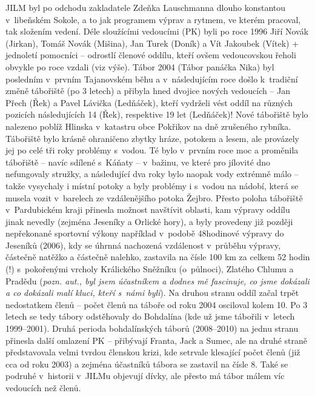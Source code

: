 \documentclass[a5paper, 12pt, twoside]{article}
\begin{document}
JILM byl po odchodu zakladatele Zdeňka Lauschmanna dlouho konstantou
v~libeňském Sokole, a to jak programem výprav a rytmem, ve kterém
pracoval, tak složením vedení. Déle sloužícími vedoucími (PK) byli po
roce 1996 Jiří Novák (Jirkan), Tomáš Novák (Mišina), Jan Turek (Doník) a
Vít Jakoubek (Vítek) + jednoletí pomocníci -- odrostlí členové oddílu,
kteří ovšem vedoucovskou řeholi obvykle po roce vzdali (viz výše). Tábor
2004 (Tábor panáčka Nika) byl posledním v~prvním Tajanovském běhu a
v~následujícím roce došlo k~tradiční změně tábořiště (po 3 letech) a
přibyla hned dvojice nových vedoucích -- Jan Přech (Řek) a Pavel Lávička
(Ledňáček), kteří vydrželi vést oddíl na různých pozicích následujících
14 (Řek), respektive 19 let (Ledňáček)! Nové tábořiště bylo nalezeno
poblíž Hlinska v~katastru obce Pokřikov na dně zrušeného rybníka.
Tábořiště bylo krásně ohraničeno zbytky hráze, potokem a lesem, ale
provázely jej po celé tři roky problémy s~vodou. Té bylo v~prvním roce
moc a proměnila tábořiště -- navíc sdílené s~Káňaty -- v~bažinu, ve
které pro jílovité dno nefungovaly stružky, a následující dva roky bylo
naopak vody extrémně málo -- takže vysychaly i místní potoky a byly
problémy i s~vodou na nádobí, která se musela vozit v~barelech ze
vzdálenějšího potoka Žejbro. Přesto poloha tábořiště v~Pardubickém kraji
přinesla možnost navštívit oblasti, kam výpravy oddílu jinak nevedly
(zejména Jeseníky a Orlické hory), a byly provedeny již později
nepřekonané sportovní výkony například v~podobě 48hodinové výpravy do
Jeseníků (2006), kdy se úhrnná nachozená vzdálenost v~průběhu výpravy,
částečně natěžko a částečně nalehko, zastavila na čísle 100 km za celkem
52 hodin (!) s~pokořenými vrcholy Králického Sněžníku (o~půlnoci),
Zlatého Chlumu a Pradědu (\textit{pozn. aut., byl jsem účastníkem a dodnes
mě fascinuje, co jsme dokázali a co dokázali malí kluci, kteří s~námi
byli}). Na druhou stranu oddíl začal trpět nedostatkem členů -- počet
členů na táboře od roku 2004 osciloval kolem 10. Po 3 letech se tedy
tábory odstěhovaly do Bohdalína (kde už jsme tábořili v~letech
1999--2001). Druhá perioda bohdalínských táborů (2008--2010) na jednu
stranu přinesla další omlazení PK -- přibývají Franta, Jack a Sumec, ale
na druhé straně představovala velmi tvrdou členskou krizi, kde setrvale
klesající počet členů (již cca od roku 2003) a zejména účastníků tábora
se zastavil na čísle 8. Také se podruhé v~historii v~JILMu objevují
dívky, ale přesto má tábor málem víc vedoucích než členů.

\end{document}

